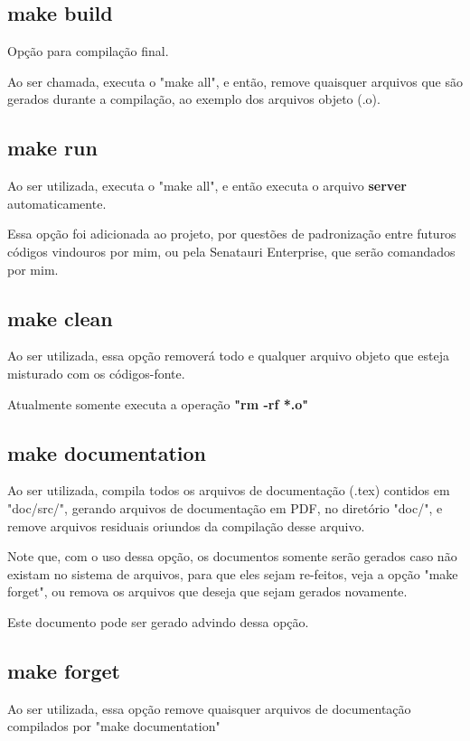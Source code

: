 \documentclass[onecolumn,12pt]{article}
\begin{document}
			\subsection{make build}
				Opção para compilação final.\par
				Ao ser chamada, executa o "make all", e então, remove quaisquer arquivos que são gerados durante a compilação, ao exemplo dos arquivos objeto (.o).
			
			\subsection{make run}
				Ao ser utilizada, executa o "make all", e então executa o arquivo \textbf{server} automaticamente.\par
				Essa opção foi adicionada ao projeto, por questões de padronização entre futuros códigos vindouros por mim, ou pela Senatauri Enterprise, que serão comandados por mim.
			
			\subsection{make clean}
				Ao ser utilizada, essa opção removerá todo e qualquer arquivo objeto que esteja misturado com os códigos-fonte.\par
				Atualmente somente executa a operação \textbf{"rm -rf *.o"}
			
			\subsection{make documentation}
				\par Ao ser utilizada, compila todos os arquivos de documentação (.tex) contidos em "doc/src/", gerando arquivos de documentação em PDF, no diretório "doc/", e remove arquivos residuais oriundos da compilação desse arquivo.\par
				Note que, com o uso dessa opção, os documentos somente serão gerados caso não existam no sistema de arquivos, para que eles sejam re-feitos, veja a opção "make forget", ou remova os arquivos que deseja que sejam gerados novamente.\par
				Este documento pode ser gerado advindo dessa opção.
				
			\subsection{make forget}
				Ao ser utilizada, essa opção remove quaisquer arquivos de documentação compilados por "make documentation"
			
\end{document}
